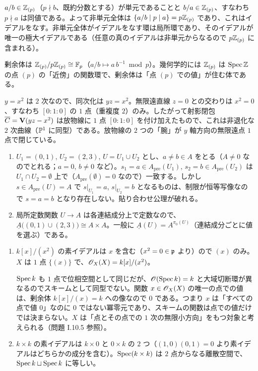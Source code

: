 $a/b\in\mathbb{Z}_{(p)}$（$p\nmid b$、既約分数とする）が単元であることと $b/a\in\mathbb{Z}_{(p)}$、すなわち $p\nmid a$ は同値である。よって非単元全体は $\{a/b\mid p\mid a\}=p\mathbb{Z}_{(p)}$ であり、これはイデアルをなす。非単元全体がイデアルをなす環は局所環であり、そのイデアルが唯一の極大イデアルである（任意の真のイデアルは非単元からなるので $p\mathbb{Z}_{(p)}$ に含まれる）。

剰余体は $\mathbb{Z}_{(p)}/p\mathbb{Z}_{(p)}\cong\mathbb{F}_p$（$a/b\mapsto a\,b^{-1}\bmod p$）。幾何学的には $\mathbb{Z}_{(p)}$ は $\operatorname{Spec}\mathbb{Z}$ の点 $(p)$ の「近傍」の関数環で、剰余体は「点 $(p)$ での値」が住む体である。

$y=x^2$ は $2$ 次なので、同次化は $yz=x^2$。無限遠直線 $z=0$ との交わりは $x^2=0$、すなわち $[0:1:0]$ の $1$ 点（重複度 $2$）のみ。したがって射影閉包 $\overline{C}=\mathbf{V}(yz-x^2)$ は放物線に $1$ 点 $[0:1:0]$ を付け加えたもので、これは非退化な $2$ 次曲線（$\mathbb{P}^1$ に同型）である。放物線の $2$ つの「腕」が $y$ 軸方向の無限遠点 $1$ 点で閉じている。

\begin{enumerate}
  \item $U_1=(0,1)$, $U_2=(2,3)$, $U=U_1\cup U_2$ とし、$a\neq b\in A$ をとる（$A\neq0$ なのでとれる；$a=0$, $b\neq0$ など）。$s_1=a\in A_{\mathrm{pre}}(U_1)$, $s_2=b\in A_{\mathrm{pre}}(U_2)$ は $U_1\cap U_2=\emptyset$ 上で（$A_{\mathrm{pre}}(\emptyset)=0$ なので）一致する。しかし $s\in A_{\mathrm{pre}}(U)=A$ で $s|_{U_1}=a$, $s|_{U_2}=b$ となるものは、制限が恒等写像なので $s=a=b$ となり存在しない。貼り合わせ公理が破れる。
  \item 局所定数関数 $U\to A$ は各連結成分上で定数なので、$\underline{A}\bigl((0,1)\cup(2,3)\bigr)\cong A\times A$。一般に $\underline{A}(U)=A^{\pi_0(U)}$（連結成分ごとに値を選ぶ）である。
\end{enumerate}

\begin{enumerate}
  \item $k[x]/(x^2)$ の素イデアルは $x$ を含む（$x^2=0\in\mathfrak{p}$ より）ので $(x)$ のみ。$X$ は $1$ 点 $\{(x)\}$ で、$\mathscr{O}_X(X)=k[x]/(x^2)$。

  $\operatorname{Spec} k$ も $1$ 点で位相空間として同じだが、$\mathscr{O}(\operatorname{Spec} k)=k$ と大域切断環が異なるのでスキームとして同型でない。関数 $x\in\mathscr{O}_X(X)$ の唯一の点での値は、剰余体 $k[x]/(x)=k$ への像なので $0$ である。つまり $x$ は「すべての点で値 $0$」なのに $0$ ではない冪零元であり、スキームの関数は点での値だけでは決まらない。$X$ は「点とその点での $1$ 次の無限小方向」をもつ対象と考えられる（問題 I.10.5 参照）。
  \item $k\times k$ の素イデアルは $k\times0$ と $0\times k$ の $2$ つ（$(1,0)(0,1)=0$ より素イデアルはどちらかの成分を含む）。$\operatorname{Spec}(k\times k)$ は $2$ 点からなる離散空間で、$\operatorname{Spec} k\sqcup\operatorname{Spec} k$ に等しい。
\end{enumerate}

